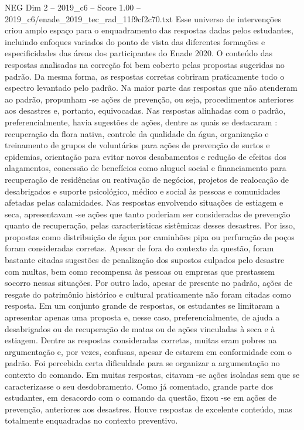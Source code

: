 \begin{textsample}{NEG Dim 2 – 2019\_c6 – Score 1.00 – 2019\_c6/enade\_2019\_tec\_rad\_11f9cf2c70.txt}
Esse universo de intervenções criou amplo espaço para o enquadramento das respostas dadas pelos estudantes, incluindo enfoques variados do ponto de vista das diferentes formações e especificidades das áreas dos participantes do Enade 2020.
O conteúdo das respostas analisadas na correção foi bem coberto pelas propostas sugeridas no padrão.
Da mesma forma, as respostas corretas cobriram praticamente todo o espectro levantado pelo padrão.
Na maior parte das respostas que não atenderam ao padrão, propunham -se ações de prevenção, ou seja, procedimentos anteriores aos desastres e, portanto, equivocadas.
Nas respostas alinhadas com o padrão, preferencialmente, havia sugestões de ações, dentre as quais se destacaram : recuperação da flora nativa, controle da qualidade da água, organização e treinamento de grupos de voluntários para ações de prevenção de surtos e epidemias, orientação para evitar novos desabamentos e redução de efeitos dos alagamentos, concessão de benefícios como aluguel social e financiamento para recuperação de residências ou reativação de negócios, projetos de realocação de desabrigados e suporte psicológico, médico e social às pessoas e comunidades afetadas pelas calamidades.
Nas respostas envolvendo situações de estiagem e seca, apresentavam -se ações que tanto poderiam ser consideradas de prevenção quanto de recuperação, pelas características sistêmicas desses desastres.
Por isso, propostas como distribuição de água por caminhões pipa ou perfuração de poços foram consideradas corretas.
Apesar de fora do contexto da questão, foram bastante citadas sugestões de penalização dos supostos culpados pelo desastre com multas, bem como recompensa às pessoas ou empresas que prestassem socorro nessas situações.
Por outro lado, apesar de presente no padrão, ações de resgate do patrimônio histórico e cultural praticamente não foram citadas como resposta.
Em um conjunto grande de respostas, os estudantes se limitaram a apresentar apenas uma proposta e, nesse caso, preferencialmente, de ajuda a desabrigados ou de recuperação de matas ou de ações vinculadas à seca e à estiagem.
Dentre as respostas consideradas corretas, muitas eram pobres na argumentação e, por vezes, confusas, apesar de estarem em conformidade com o padrão.
Foi percebida certa dificuldade para se organizar a argumentação no contexto do comando.
Em muitas respostas, citavam -se ações isoladas sem que se caracterizasse o seu desdobramento.
Como já comentado, grande parte dos estudantes, em desacordo com o comando da questão, fixou -se em ações de prevenção, anteriores aos desastres.
Houve respostas de excelente conteúdo, mas totalmente enquadradas no contexto preventivo.

\end{textsample}
